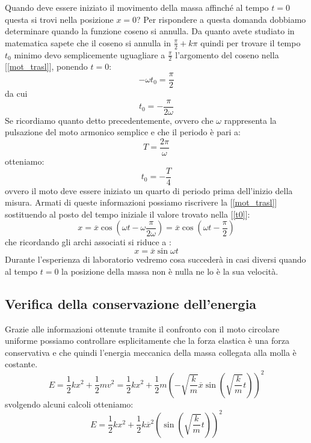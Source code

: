 \documentclass[a4paper,10pt,oneside]{article}
\begin{document}
Quando deve essere iniziato il movimento della massa affinché al tempo $t=0$ questa si trovi nella posizione $x=0$? Per rispondere a questa domanda dobbiamo determinare quando la funzione coseno si annulla. Da quanto avete studiato in matematica sapete che il coseno si annulla in $\frac \pi 2 +k\pi$ quindi per trovare il tempo $t_0$ minimo devo semplicemente uguagliare a $\frac \pi 2 $ l'argomento del coseno nella [\ref{mot_trasl}], ponendo $t=0$:
\begin{equation}
 -\omega t_0=\frac \pi 2
\end{equation}
da cui
\begin{equation}\label{t0}
 t_0=-\frac{\pi}{2\omega}
\end{equation}
Se ricordiamo quanto detto precedentemente, ovvero che $\omega$ rappresenta la pulsazione del moto armonico semplice e che il periodo è pari a:
\begin{equation}
 T=\frac{2\pi}{\omega}
\end{equation}
otteniamo:
\begin{equation}
 t_0=-\frac{T}{4}
\end{equation}
ovvero il moto deve essere iniziato un quarto di periodo prima dell'inizio della misura. Armati di queste informazioni possiamo riscrivere la [\ref{mot_trasl}] sostituendo al posto del tempo iniziale il valore trovato nella [\ref{t0}]:
\begin{equation}
 x=\overline x \cos(\omega t-\omega \frac{\pi}{2\omega})=\overline x \cos(\omega t-\frac \pi 2)
\end{equation}
che ricordando gli archi associati si riduce a :
\begin{equation}
 x=\overline x\sin\omega t
\end{equation}
Durante l'esperienza di laboratorio vedremo cosa succederà in casi diversi quando al tempo $t=0$ la posizione della massa non è nulla ne lo è la sua velocità.

\subsection*{Verifica della conservazione dell'energia}
Grazie alle informazioni ottenute tramite il confronto con il moto circolare uniforme possiamo controllare esplicitamente che la forza elastica è una forza conservativa e che quindi l'energia meccanica della massa collegata alla molla è costante.
\begin{equation}
 E=\frac 1 2 kx^2 +\frac 1 2 mv^2=\frac 1 2 kx^2 +\frac 1 2m \left(-\sqrt{\frac k m }\overline x\sin(\sqrt{\frac k m }t)\right)^2
\end{equation}
svolgendo alcuni calcoli otteniamo:
\begin{equation}\label{cons_mol1}
 E=\frac 1 2 kx^2+\frac 1 2  k \overline x^2\left(\sin( \sqrt{\frac k m}t)\right)^2
\end{equation}
\end{document}
